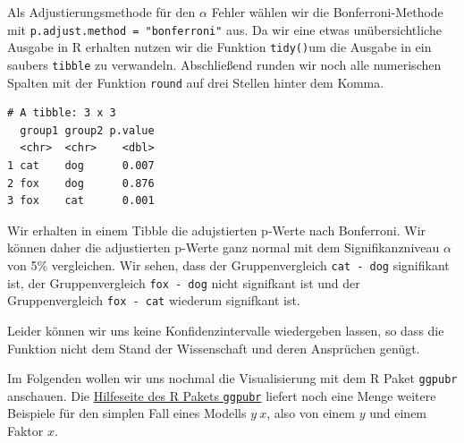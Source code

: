 \documentclass[
  letterpaper,
]{scrbook}
\newenvironment{Shaded}{\begin{snugshade}}{\end{snugshade}}
\newcommand{\AttributeTok}[1]{\textcolor[rgb]{0.40,0.45,0.13}{#1}}
\newcommand{\DecValTok}[1]{\textcolor[rgb]{0.68,0.00,0.00}{#1}}
\newcommand{\FunctionTok}[1]{\textcolor[rgb]{0.28,0.35,0.67}{#1}}
\newcommand{\NormalTok}[1]{\textcolor[rgb]{0.00,0.23,0.31}{#1}}
\newcommand{\SpecialCharTok}[1]{\textcolor[rgb]{0.37,0.37,0.37}{#1}}
\newcommand{\StringTok}[1]{\textcolor[rgb]{0.13,0.47,0.30}{#1}}
\begin{document}

Als Adjustierungsmethode für den \(\alpha\) Fehler wählen wir die
Bonferroni-Methode mit \texttt{p.adjust.method\ =\ "bonferroni"} aus. Da
wir eine etwas unübersichtliche Ausgabe in R erhalten nutzen wir die
Funktion \texttt{tidy()}um die Ausgabe in ein saubers \texttt{tibble} zu
verwandeln. Abschließend runden wir noch alle numerischen Spalten mit
der Funktion \texttt{round} auf drei Stellen hinter dem Komma.

\begin{Shaded}
\end{Shaded}

\begin{verbatim}
# A tibble: 3 x 3
  group1 group2 p.value
  <chr>  <chr>    <dbl>
1 cat    dog      0.007
2 fox    dog      0.876
3 fox    cat      0.001
\end{verbatim}

Wir erhalten in einem Tibble die adujstierten p-Werte nach Bonferroni.
Wir können daher die adjustierten p-Werte ganz normal mit dem
Signifikanzniveau \(\alpha\) von 5\% vergleichen. Wir sehen, dass der
Gruppenvergleich \texttt{cat\ -\ dog} signifikant ist, der
Gruppenvergleich \texttt{fox\ -\ dog} nicht signifkant ist und der
Gruppenvergleich \texttt{fox\ -\ cat} wiederum signifkant ist.

Leider können wir uns keine Konfidenzintervalle wiedergeben lassen, so
dass die Funktion nicht dem Stand der Wissenschaft und deren Ansprüchen
genügt.

Im Folgenden wollen wir uns nochmal die Visualisierung mit dem R Paket
\texttt{ggpubr} anschauen. Die
\href{https://rpkgs.datanovia.com/ggpubr/index.html}{Hilfeseite des R
Pakets \texttt{ggpubr}} liefert noch eine Menge weitere Beispiele für
den simplen Fall eines Modells \(y ~ x\), also von einem \(y\) und einem
Faktor \(x\).
\end{document}
